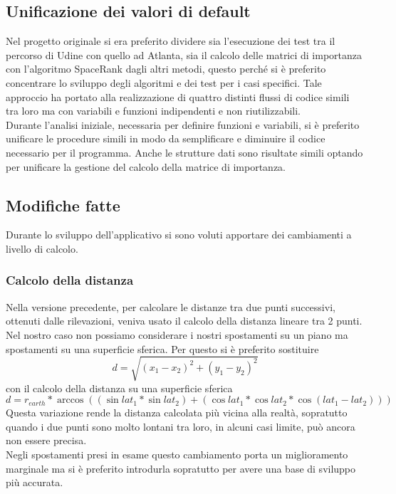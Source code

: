 \subsection{Unificazione dei valori di default}
Nel progetto originale si era preferito dividere sia l'esecuzione dei test tra il percorso di Udine con quello ad Atlanta,
sia il calcolo delle matrici di importanza con l'algoritmo SpaceRank dagli altri metodi, questo perch\'e si \`e preferito
concentrare lo sviluppo degli algoritmi e dei test per i casi specifici.
Tale approccio ha portato alla realizzazione di quattro distinti flussi di codice simili tra loro ma con variabili e funzioni
indipendenti e non riutilizzabili.\\
Durante l'analisi iniziale, necessaria per definire funzioni e variabili, si \`e preferito unificare le procedure simili in modo da
semplificare e diminuire il codice necessario per il programma. Anche le strutture dati sono risultate simili optando per
unificare la gestione del calcolo della matrice di importanza.\\

\subsection{Modifiche fatte}
Durante lo sviluppo dell'applicativo si sono voluti apportare dei cambiamenti
a livello di calcolo.
\subsubsection{Calcolo della distanza}
Nella versione precedente, per calcolare le distanze tra due punti successivi,
ottenuti dalle rilevazioni, veniva usato il calcolo della distanza lineare tra 2 punti. Nel nostro caso
non possiamo considerare i nostri spostamenti su un piano ma spostamenti su una
superficie sferica. Per questo si \`e preferito sostituire
\begin{equation}
d =  \sqrt{(x_{1}-x_{2})^2 + (y_{1}-y_{2})^2}
\end{equation}
con il calcolo della distanza su una superficie sferica
\begin{equation}
d = r_{earth} * \arccos{( (\sin{lat_{1}} * \sin{lat_{2}}) + (\cos{lat_{1}} * \cos{lat_{2}} * \cos{(lat_{1} - lat_{2})} ) )}
\end{equation}
Questa variazione rende la distanza calcolata pi\`u vicina alla realt\`a, sopratutto
quando i due punti sono molto lontani tra loro, in alcuni casi limite, pu\`o ancora non essere precisa.\\
Negli spostamenti presi in esame questo cambiamento porta un miglioramento marginale ma si \`e preferito
introdurla sopratutto per avere una base di sviluppo pi\`u accurata.

